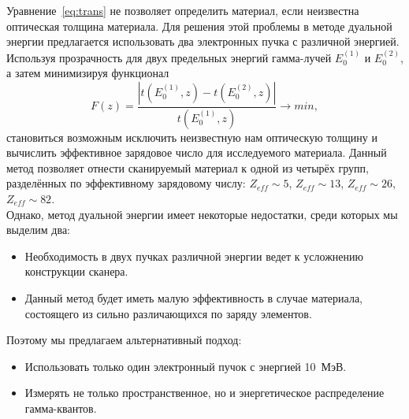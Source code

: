 \documentclass[a4paper]{panl}
\begin{document}
Уравнение~\ref{eq:trans} не позволяет определить материал, если неизвестна оптическая толщина материала. Для решения этой проблемы в методе дуальной энергии предлагается использовать два электронных пучка с различной энергией. Используя прозрачность для двух предельных энергий гамма-лучей $E^{(1)}_0$ и $E^{(2)}_0$, а затем минимизируя функционал
\begin{equation}
F(z) = \frac{|t(E^{(1)}_0,z) - t(E^{(2)}_0,z)|}{t(E^{(1)}_0,z)} \to min,
\end{equation}
становиться возможным исключить неизвестную нам оптическую толщину и вычислить эффективное зарядовое число для исследуемого материала. Данный метод позволяет отнести сканируемый материал к одной из четырёх групп, разделённых по эффективному зарядовому числу: $Z_{eff} \sim 5$, $Z_{eff} \sim 13$, $Z_{eff} \sim 26$, $Z_{eff} \sim 82$.\\
Однако, метод дуальной энергии имеет некоторые недостатки, среди которых мы выделим два:
    \begin{itemize}
        \item Необходимость в двух пучках различной энергии ведет к усложнению конструкции сканера.
        \item Данный метод будет иметь малую эффективность в случае материала, состоящего из сильно различающихся по заряду элементов.
    \end{itemize}
Поэтому мы предлагаем альтернативный подход:
    \begin{itemize}
        \item Использовать только один электронный пучок с энергией 10~МэВ.
        \item Измерять не только пространственное, но и энергетическое распределение гамма-квантов.
    \end{itemize}
\end{document}

